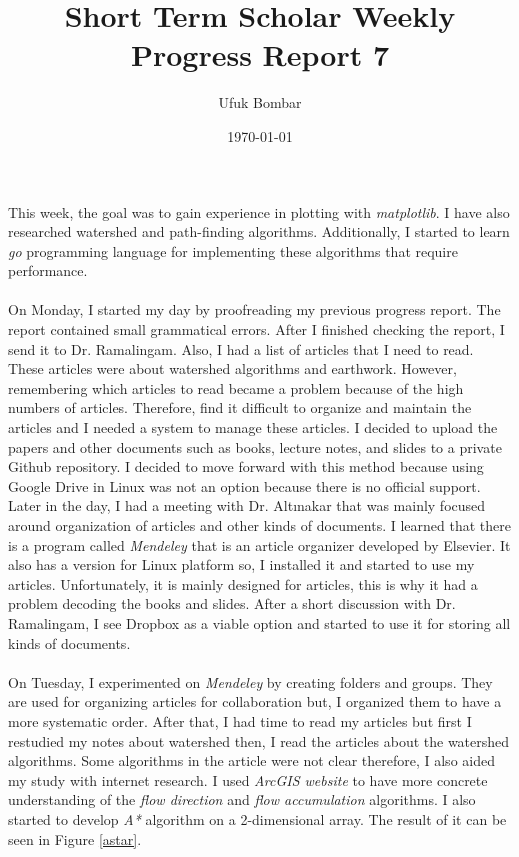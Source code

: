 \documentclass{article}
\title{Short Term Scholar Weekly Progress Report 7}
\author{Ufuk Bombar}
\date{\today}
\begin{document}
    \maketitle

    \paragraph{}
        This week, the goal was to gain experience in plotting with \textit{matplotlib}. I have also researched watershed and path-finding algorithms. Additionally, I started to learn \textit{go} programming language for implementing these algorithms that require performance.

    \paragraph{}
        On Monday, I started my day by proofreading my previous progress report. The report contained small grammatical errors. After I finished checking the report, I send it to Dr. Ramalingam. Also, I had a list of articles that I need to read. These articles were about watershed algorithms and earthwork. However, remembering which articles to read became a problem because of the high numbers of articles. Therefore, find it difficult to organize and maintain the articles and I needed a system to manage these articles. I decided to upload the papers and other documents such as books, lecture notes, and slides to a private Github repository. I decided to move forward with this method because using Google Drive in Linux was not an option because there is no official support. Later in the day, I had a meeting with Dr. Altınakar that was mainly focused around organization of articles and other kinds of documents. I learned that there is a program called \textit{Mendeley} that is an article organizer developed by Elsevier\cite{mendeley}. It also has a version for Linux platform so, I installed it and started to use my articles. Unfortunately, it is mainly designed for articles, this is why it had a problem decoding the books and slides. After a short discussion with Dr. Ramalingam, I see Dropbox as a viable option and started to use it for storing all kinds of documents.

    \paragraph{}
        On Tuesday, I experimented on \textit{Mendeley} by creating folders and groups. They are used for organizing articles for collaboration but, I organized them to have a more systematic order. After that, I had time to read my articles but first I restudied my notes about watershed then, I read the articles about the watershed algorithms. Some algorithms in the article were not clear therefore, I also aided my study with internet research. I used \textit{ArcGIS website} to have more concrete understanding of the \textit{flow direction} and \textit{flow accumulation} algorithms\cite{arcgis1, arcgis2}. I also started to develop \textit{A*} algorithm on a 2-dimensional array. The result of it can be seen in Figure \ref{astar}.
\end{document}
